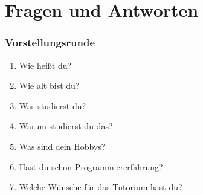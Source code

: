 \documentclass[12pt]{beamer}
\begin{document}
\section{Fragen und Antworten}

\begin{frame}
	\frametitle{Vorstellungsrunde}
	\begin{enumerate}
		\item Wie heißt du?
		\item Wie alt bist du?
		\item Was studierst du?
		\item Warum studierst du das?
		\item Was sind dein Hobbys?
		\item Hast du schon Programmiererfahrung?
		\item Welche Wünsche für das Tutorium hast du?
	\end{enumerate}
\end{frame}
\end{document}
